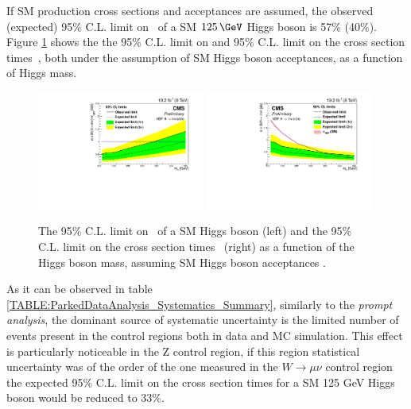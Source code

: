 If \gls{SM} production cross sections and acceptances are assumed, the observed (expected) 95\% C.L. limit on \BRinv\, of a \gls{SM} $125\,\GeV$ Higgs boson is 57\% (40\%). Figure \ref{FIGURE:ParkedDataAnalysis_Limits_VBFLimit} shows the the 95\% C.L. limit on \BRinv and 95\% C.L. limit on the cross section times \BRinv\,, both under the assumption of \gls{SM} Higgs boson acceptances, as a function of Higgs mass.

\begin{figure}[!htb]
\centering
\includegraphics[width=0.49\textwidth]{Chapter07/Images/vbflimit.pdf}
\includegraphics[width=0.49\textwidth]{Chapter07/Images/vbfxslimit.pdf}
\caption{The 95\% C.L. limit on \BRinv\, of a SM Higgs boson (left) and the 95\% C.L. limit on the cross section times \BRinv\ (right) as a function of the Higgs boson mass, assuming SM Higgs boson acceptances \cite{ARTICLE:CMSVBFHiggsInvisibleParkedAnalysisPAS}.}
\label{FIGURE:ParkedDataAnalysis_Limits_VBFLimit}
\end{figure}

As it can be observed in table \ref{TABLE:ParkedDataAnalysis_Systematics_Summary}, similarly to the \textit{prompt analysis}, the dominant source of systematic uncertainty is the limited number of events present in the control regions both in data and \gls{MC} simulation. This effect is particularly noticeable in the Z control region, if this region statistical uncertainty was of the order of the one measured in the $W\rightarrow\mu\nu$ control region the expected 95\% C.L. limit on the cross section times \BRinv for a \gls{SM} 125 GeV Higgs boson would be reduced to 33\%.


